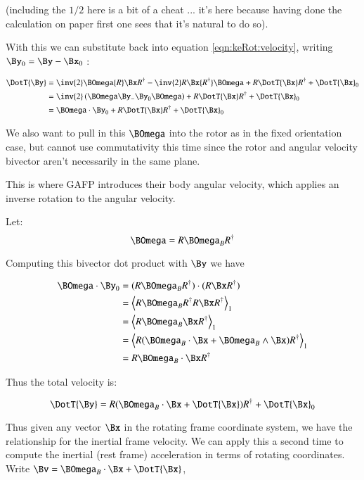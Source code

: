 (including the $1/2$ here is a bit of a cheat ... it's here because having done the calculation on paper first one sees that it's natural to do so).

With this we can substitute back into equation \ref{eqn:keRot:velocity}, writing $\By_0 = \By - \Bx_0$ :

\begin{align*}
\DotT{\By}
&= \inv{2} \BOmega {R} \Bx R^\dagger - \inv{2} R \Bx {R^\dagger} \BOmega +R \DotT{\Bx} R^\dagger + \DotT{\Bx}_0 \\
&= \inv{2}\left(\BOmega \By_ - \By_0 \BOmega\right) +R \DotT{\Bx} R^\dagger + \DotT{\Bx}_0 \\
&= \BOmega \cdot \By_0 +R \DotT{\Bx} R^\dagger + \DotT{\Bx}_0 \\
\end{align*}

We also want to pull in this $\BOmega$ into the rotor as in the fixed orientation
case, but cannot use commutativity this time since the rotor and angular velocity bivector aren't necessarily in the same plane.

This is where GAFP introduces their body angular velocity, which applies an inverse rotation to the angular velocity.

Let:
\[
\BOmega = R \BOmega_B R^\dagger
\]

Computing this bivector dot product with $\By$ we have

\begin{align*}
\BOmega \cdot \By_0
&= (R \BOmega_B R^\dagger) \cdot (R \Bx R^\dagger) \\
&= \gpgradeone{R \BOmega_B R^\dagger R \Bx R^\dagger} \\
&= \gpgradeone{R \BOmega_B \Bx R^\dagger} \\
&= \gpgradeone{R (\BOmega_B \cdot \Bx + \BOmega_B \wedge \Bx) R^\dagger} \\
&= {R \BOmega_B \cdot \Bx R^\dagger} \\
\end{align*}

Thus the total velocity is:

\begin{equation}
\DotT{\By} = {R (\BOmega_B \cdot \Bx + \DotT{\Bx} )R^\dagger} + \DotT{\Bx}_0
\end{equation}

Thus given any vector $\Bx$ in the rotating frame coordinate system, we have the relationship for the inertial frame velocity.  We can apply this a second
time to compute the inertial (rest frame) acceleration in terms of rotating coordinates.  Write $\Bv = \BOmega_B \cdot \Bx + \DotT{\Bx}$, 

